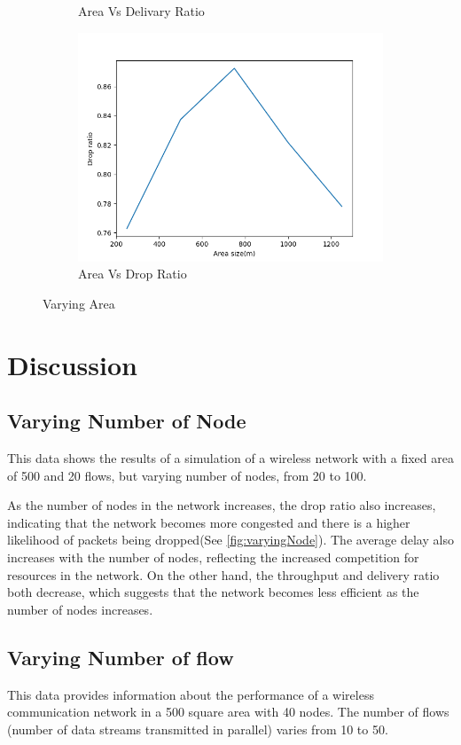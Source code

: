 \documentclass[14pt]{scrartcl} %
\begin{document}
\begin{figure}[h]
\begin{subfigure}{.5\textwidth}
    \caption{Area Vs Delivary Ratio}
    \label{fig-11}
\end{subfigure}
\begin{subfigure}{.5\textwidth}
    \centering
    \includegraphics[width=.8\linewidth]{Graph/areaVsDropRatio.png}
    \caption{Area Vs Drop Ratio}
    \label{fig-12}
\end{subfigure}
\caption{Varying Area}
\label{fig:varyingArea}
\end{figure}
\section{Discussion}
\subsection{Varying Number of Node}
This data shows the results of a simulation of a wireless network with a fixed area of 500 and 20 flows, but varying number of nodes, from 20 to 100.

As the number of nodes in the network increases, the drop ratio also increases, indicating that the network becomes more congested and there is a higher likelihood of packets being dropped(See \ref{fig:varyingNode}). The average delay also increases with the number of nodes, reflecting the increased competition for resources in the network. On the other hand, the throughput and delivery ratio both decrease, which suggests that the network becomes less efficient as the number of nodes increases.
\subsection{Varying Number of flow}
This data provides information about the performance of a wireless communication network in a 500 square area with 40 nodes. The number of flows (number of data streams transmitted in parallel) varies from 10 to 50.
\end{document}
